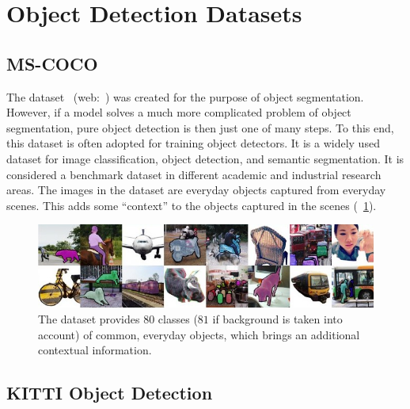 \section{Object Detection Datasets}
\label{sec:ObjectDetectionDatasets}

\subsection{MS-COCO}
\label{ssec:DatasetMSCOCO}

The \mscoco{} dataset~\cite{lin2014mscoco} (web:~\cite{webmscocodataset}) was created for the purpose of object segmentation. However, if a model solves a much more complicated problem of object segmentation, pure object detection is then just one of many steps. To this end, this dataset is often adopted for training object detectors. It is a widely used dataset for image classification, object detection, and semantic segmentation. It is considered a benchmark dataset in different academic and industrial research areas. The images in the dataset are everyday objects captured from everyday scenes. This adds some “context” to the objects captured in the scenes (\figtext{}~\ref{fig:MSCOCODataset}).

\begin{figure}[t]
    \centerline{\includegraphics[width=0.9\linewidth]{figures/datasets/ms_coco_sample.jpeg}}
    \caption[\mscoco{} dataset]{The \mscoco{} dataset provides $80$ classes ($81$ if background is taken into account) of common, everyday objects, which brings an additional contextual information. }
    \label{fig:MSCOCODataset}
\end{figure}

\subsection{KITTI Object Detection}
\label{ssec:DatasetKITTIObjectDetection}

